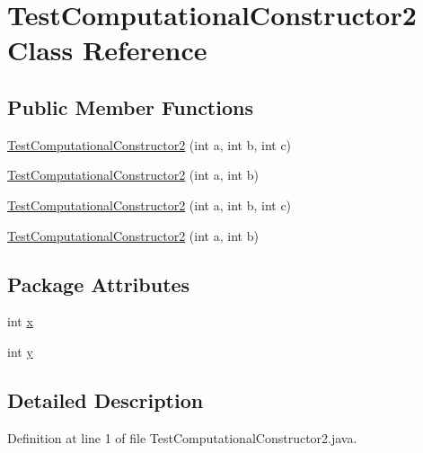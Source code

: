 \hypertarget{classTestComputationalConstructor2}{
\section{TestComputationalConstructor2 Class Reference}
\label{classTestComputationalConstructor2}
}
\subsection*{Public Member Functions}
\begin{DoxyCompactItemize}
\item 
\hyperlink{classTestComputationalConstructor2_a69a94b3631c5b4d1507ce84e84da31c2}{TestComputationalConstructor2} (int a, int b, int c)
\item 
\hyperlink{classTestComputationalConstructor2_a41b269b72c4d053e5e2528b8bc8b71ad}{TestComputationalConstructor2} (int a, int b)
\item 
\hyperlink{classTestComputationalConstructor2_a69a94b3631c5b4d1507ce84e84da31c2}{TestComputationalConstructor2} (int a, int b, int c)
\item 
\hyperlink{classTestComputationalConstructor2_a41b269b72c4d053e5e2528b8bc8b71ad}{TestComputationalConstructor2} (int a, int b)
\end{DoxyCompactItemize}
\subsection*{Package Attributes}
\begin{DoxyCompactItemize}
\item 
int \hyperlink{classTestComputationalConstructor2_a8c838ffcc9a1ea5dc12cb3cceaf735c8}{x}
\item 
int \hyperlink{classTestComputationalConstructor2_a469df9698753af791f46ca0384d2a3dd}{y}
\end{DoxyCompactItemize}


\subsection{Detailed Description}


Definition at line 1 of file TestComputationalConstructor2.java.



